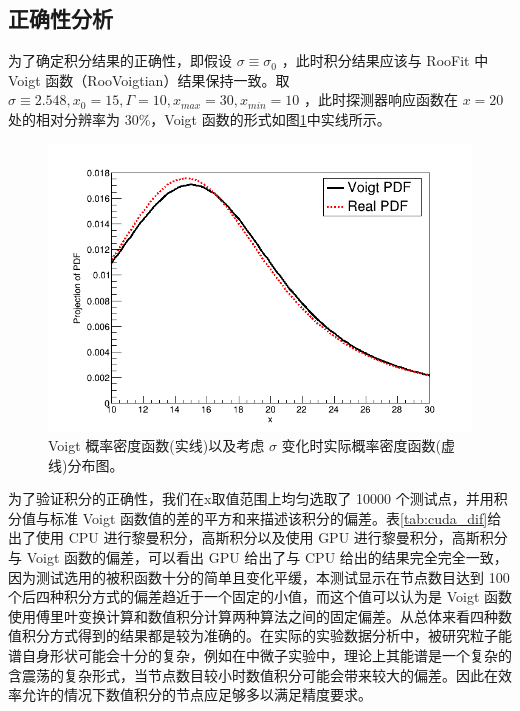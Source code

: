 \subsection{正确性分析}

为了确定积分结果的正确性，即假设 $\sigma \equiv \sigma_0$ ，此时积分结果应该与 RooFit 中 Voigt 函数（RooVoigtian）结果保持一致。取 $\sigma \equiv 2.548, x_0=15, \Gamma=10,x_{max}=30,x_{min}=10$ ，此时探测器响应函数在 $x=20$ 处的相对分辨率为 30\%，Voigt 函数的形式如图\ref{fig:cuda_com}中实线所示。

\begin{figure}
    \centering
    \includegraphics[width=0.6\columnwidth]{pic/cuda1.png}
    \caption{ Voigt 概率密度函数(实线)以及考虑 $\sigma$ 变化时实际概率密度函数(虚线)分布图。}
    \label{fig:cuda_com}
\end{figure}

为了验证积分的正确性，我们在x取值范围上均匀选取了 10000 个测试点，并用积分值与标准 Voigt 函数值的差的平方和来描述该积分的偏差。表\ref{tab:cuda_dif}给出了使用 CPU 进行黎曼积分，高斯积分以及使用 GPU 进行黎曼积分，高斯积分与 Voigt 函数的偏差，可以看出 GPU 给出了与 CPU 给出的结果完全完全一致，因为测试选用的被积函数十分的简单且变化平缓，本测试显示在节点数目达到 100 个后四种积分方式的偏差趋近于一个固定的小值，而这个值可以认为是 Voigt 函数使用傅里叶变换计算和数值积分计算两种算法之间的固定偏差。从总体来看四种数值积分方式得到的结果都是较为准确的。在实际的实验数据分析中，被研究粒子能谱自身形状可能会十分的复杂，例如在中微子实验中，理论上其能谱是一个复杂的含震荡的复杂形式，当节点数目较小时数值积分可能会带来较大的偏差。因此在效率允许的情况下数值积分的节点应足够多以满足精度要求。

